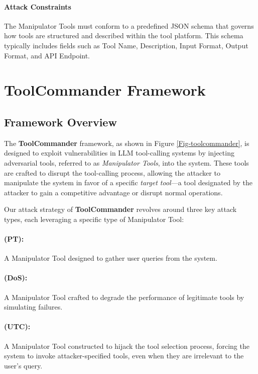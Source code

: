 \paragraph{Attack Constraints}

The Manipulator Tools must conform to a predefined JSON schema that governs how tools are structured and described within the tool platform. This schema typically includes fields such as Tool Name, Description, Input Format, Output Format, and API Endpoint.

\section{ToolCommander Framework}

\subsection{Framework Overview}
The \textbf{ToolCommander} framework, as shown in Figure \ref{Fig-toolcommander},  is designed to exploit vulnerabilities in LLM tool-calling systems by injecting adversarial tools, referred to as \textit{Manipulator Tools}, into the system. These tools are crafted to disrupt the tool-calling process, allowing the attacker to manipulate the system in favor of a specific \textit{target tool}—a tool designated by the attacker to gain a competitive advantage or disrupt normal operations.  

Our attack strategy of \textbf{ToolCommander} revolves around three key attack types, each leveraging a specific type of Manipulator Tool:
\paragraph{\PT (PT):} A Manipulator Tool designed to gather user queries from the system.
\paragraph{\DoS (DoS):} A Manipulator Tool crafted to degrade the performance of legitimate tools by simulating failures.
\paragraph{\UTC (UTC):} A Manipulator Tool constructed to hijack the tool selection process, forcing the system to invoke attacker-specified tools, even when they are irrelevant to the user's query.

